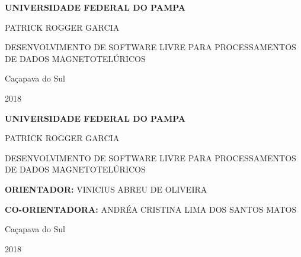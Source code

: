 
\newpage
    \begin{center}
      {\bf
	  \large UNIVERSIDADE FEDERAL DO PAMPA

	      \vspace{150pt}
	  
	      PATRICK ROGGER GARCIA
	  
	  
	  \vfill
	      \large DESENVOLVIMENTO DE SOFTWARE LIVRE PARA PROCESSAMENTOS DE DADOS MAGNETOTELÚRICOS
	  \vfill}
      
	  
      \bf{
	  Caçapava do Sul
 
	  2018}
\end{center}


\newpage
    \begin{center}
      {\bf
	  \large UNIVERSIDADE FEDERAL DO PAMPA

	      \vspace{150pt}
	  
	      PATRICK ROGGER GARCIA
	  
	  
	  \vfill
	      \large DESENVOLVIMENTO DE SOFTWARE LIVRE PARA PROCESSAMENTOS DE DADOS MAGNETOTELÚRICOS
	  \vfill}
      

	  {\bf
	      ORIENTADOR:}
	      VINICIUS ABREU DE OLIVEIRA
	   
	  {\bf
	      CO-ORIENTADORA:}
	      ANDRÉA CRISTINA LIMA DOS SANTOS MATOS 
	      \vspace{200pt}
	  
      \bf{
	  Caçapava do Sul
 
	  2018}
\end{center}
